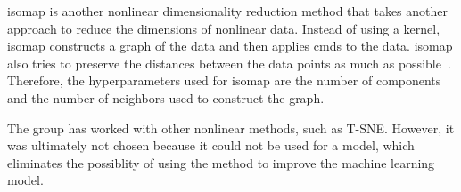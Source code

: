 \gls{isomap} is another nonlinear dimensionality reduction method that takes another approach to reduce the dimensions of nonlinear data. Instead of using a kernel, \gls{isomap} constructs a graph of the data and then applies \gls{cmds} to the data. \gls{isomap} also tries to preserve the distances between the data points as much as possible~\cite{dimensionality-reduction-comparative-review}. Therefore, the hyperparameters used for \gls{isomap} are the number of components and the number of neighbors used to construct the graph.


The group has worked with other nonlinear methods, such as T-SNE. However, it was ultimately not chosen because it could not be used for a model, which eliminates the possiblity of using the method to improve the machine learning model.

